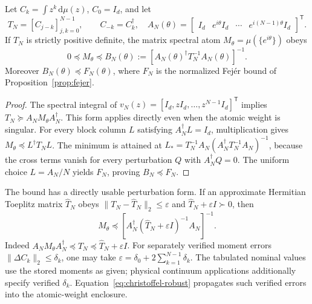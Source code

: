 \begin{proposition}\label{prop:christoffel}
Let $C_k=\int z^k\,\mathrm d\mu(z)$, $C_0=I_d$, and let
\begin{equation}
T_N=[C_{j-k}]_{j,k=0}^{N-1},\qquad C_{-k}=C_k^\dagger,
\quad A_N(\theta)=\begin{bmatrix}I_d&e^{i\theta}I_d&\cdots&e^{i(N-1)\theta}I_d\end{bmatrix}^{\!\mathsf T}.
\end{equation}
If $T_N$ is strictly positive definite, the matrix spectral atom $M_\theta=\mu(\{e^{i\theta}\})$ obeys
\begin{equation}\label{eq:christoffel-bound}
\boxed{0\preceq M_\theta\preceq B_N(\theta):=
\left[A_N(\theta)^\dagger T_N^{-1}A_N(\theta)\right]^{-1}.}
\end{equation}
Moreover $B_N(\theta)\preceq F_N(\theta)$, where $F_N$ is the normalized Fej\'er bound of Proposition~\ref{prop:fejer}.
\end{proposition}
\begin{proof}
The spectral integral of $v_N(z)=[I_d,zI_d,\ldots,z^{N-1}I_d]^\mathsf T$ implies $T_N\succeq A_NM_\theta A_N^\dagger$. This form applies directly even when the atomic weight is singular. For every block column $L$ satisfying $A_N^\dagger L=I_d$, multiplication gives $M_\theta\preceq L^\dagger T_NL$. The minimum is attained at $L_*=T_N^{-1}A_N(A_N^\dagger T_N^{-1}A_N)^{-1}$, because the cross terms vanish for every perturbation $Q$ with $A_N^\dagger Q=0$. The uniform choice $L=A_N/N$ yields $F_N$, proving $B_N\preceq F_N$.\end{proof}

The bound has a directly usable perturbation form. If an approximate Hermitian Toeplitz matrix $\widehat T_N$ obeys $\|T_N-\widehat T_N\|_2\leq\varepsilon$ and $\widehat T_N+\varepsilon I\succ0$, then
\begin{equation}\label{eq:christoffel-robust}
M_\theta\preceq \left[A_N^\dagger(\widehat T_N+\varepsilon I)^{-1}A_N\right]^{-1}.
\end{equation}
Indeed $A_NM_\theta A_N^\dagger\preceq T_N\preceq\widehat T_N+\varepsilon I$. For separately verified moment errors $\|\Delta C_k\|_2\leq\delta_k$, one may take $\varepsilon=\delta_0+2\sum_{k=1}^{N-1}\delta_k$. The tabulated nominal values use the stored moments as given; physical continuum applications additionally specify verified $\delta_k$. Equation~\eqref{eq:christoffel-robust} propagates such verified errors into the atomic-weight enclosure.

